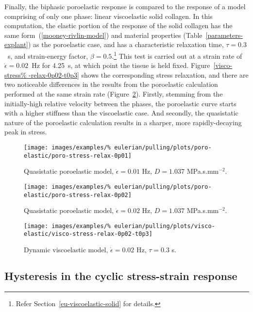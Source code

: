 Finally, the biphasic poroelastic response is compared to the response
of a model comprising of only one phase: linear viscoelastic solid
collagen. In this computation, the elastic portion of the response of
the solid collagen has the same form~(\ref{mooney-rivlin-model}) and
material properties (Table~\ref{parameters-explant}) as the
poroelastic case, and has a characteristic relaxation time,
$\tau=0.3$~s, and strain-energy factor, $\beta=0.5$.\footnote{Refer
  Section~\ref{eu-viscoelastic-solid} for details.} This test is
carried out at a strain rate of $\dot{\epsilon}=0.02$~Hz for 4.25~s,
at which point the tissue is held fixed. Figure~\ref{visco-stress%
  -relax-0p02-t0p3} shows the corresponding stress relaxation, and
there are two noticeable differences in the results from the
poroelastic calculation performed at the same strain rate
(Figure~\ref{poro-stress-relax-0p02}).  Firstly, stemming from the
initially-high relative velocity between the phases, the poroelastic
curve starts with a higher stiffness than the viscoelastic case. And
secondly, the quasistatic nature of the poroelastic calculation
results in a sharper, more rapidly-decaying peak in stress.

\clearpage

\begin{figure}[!hptb]
  \centering
  \texttt{[image: images/examples/\%
    eulerian/pulling/plots/poro-elastic/poro-stress-relax-0p01]}
  \caption{Quasistatic poroelastic model, $\dot{\epsilon}=0.01$ Hz,
    $D=1.037$ MPa.s.mm$^{-2}$.}
  \label{poro-stress-relax-0p01}
\end{figure}

\begin{figure}[!hptb]
  \centering
  \texttt{[image: images/examples/\%
    eulerian/pulling/plots/poro-elastic/poro-stress-relax-0p02]}
  \caption{Quasistatic poroelastic model, $\dot{\epsilon}=0.02$ Hz,
    $D=1.037$ MPa.s.mm$^{-2}$.}
  \label{poro-stress-relax-0p02}
\end{figure}

\begin{figure}[!hptb]
  \centering
  \texttt{[image: images/examples/\%
    eulerian/pulling/plots/visco-elastic/visco-stress-relax-0p02-t0p3]}
  \caption{Dynamic viscoelastic model, $\dot{\epsilon}=0.02$ Hz,
    $\tau=0.3$ s.}
  \label{visco-stress-relax-0p02-t0p3}
\end{figure}

\subsection{Hysteresis in the cyclic stress-strain response}
\label{hysteresis}

